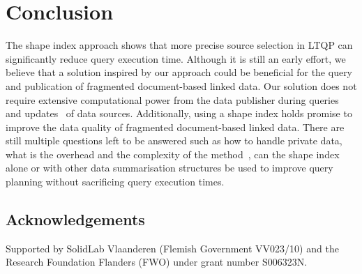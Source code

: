 \section{Conclusion}



The shape index approach shows that more precise source selection in LTQP can significantly reduce query execution time.
Although it is still an early effort, we believe that a solution inspired by our approach could be beneficial for the query and publication of fragmented document-based linked data.
Our solution does not require extensive computational power from the data publisher during queries and updates~ of data sources.
Additionally, using a shape index holds promise to improve the data quality of fragmented document-based linked data.
There are still multiple questions left to be answered such as how to handle private data, what is the overhead and the complexity of the method~,
can the shape index alone or with other data summarisation structures be used to improve query planning without sacrificing query execution times.

\subsection*{Acknowledgements}
Supported by SolidLab Vlaanderen (Flemish Government VV023/10) and the Research Foundation Flanders (FWO) under grant number S006323N.

